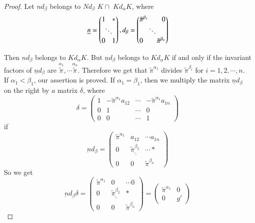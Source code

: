 \begin{proof}
  Let $n d _ \beta $ belongs to $N d_\beta$ $K \cap $ $Kd_\alpha  K$, where
  \begin {equation*}
    \underline{n}=
    \begin{pmatrix}
      1 \quad  *\\
      \ddots\\
      0 \quad  1
    \end{pmatrix}, 
    d_\beta=
    \begin{pmatrix}
       \tilde{\pi}^{\beta_1} \qquad 0\\
             \ddots\\
      0 \qquad  \tilde{\pi}^{\beta_n}
    \end{pmatrix}
  \end{equation*}
  
  Then $n d_\beta$  belongs to $K d_\alpha  K$. But   $\underline{n} d
  _\beta $ belongs to $ K d_\alpha  K $ if and only if the
  invariant factors of $\underline{n}  d_ \beta $ are $
  \overset{\alpha  _1} {\tilde {\pi}}, \cdots \overset{\alpha  _n}
          {\tilde {\pi}} $. Therefore we get that $\tilde{\pi}^{\alpha
            _1}$ divides $\tilde{\pi}^{\beta_i}$ for  $i = 1, 2,
          \cdots,  n$. If $\alpha_1 < 
          \beta_1$, our assertion is proved. If $ \alpha  _1 = \beta_1$,
          then we multiply the matrix $\underline n d_\beta$ on the
          right by $a$ matrix $\delta$, where 
   \begin{equation*}
     \delta =
     \begin{pmatrix}
       1& - \tilde{\pi}^ {\alpha _1} a _{12}& \cdots & -
       \tilde{\pi}^ {\alpha _1} a_{1n}\\ 
       0& 1 & \cdots& 0\\
       0& 0 & \cdots& 1
     \end{pmatrix}
   \end{equation*}
   if
   \begin{equation*}
     \underbar{n}d_\beta =
     \begin{pmatrix}
       \tilde{\pi}^{\alpha _1}& a_{12} & \cdots a_{1n}\\
       0 & \underset{\ddots}{\tilde{\pi}^{\beta _2}} & \cdots *\\
       0 & 0 & \tilde{\pi}^{\beta_n}
     \end{pmatrix}
   \end{equation*}\pageoriginale
   So we get
   \begin{equation*}
     \underbar{n}d_\beta \delta =
     \begin{pmatrix}
       \tilde{\pi}^{\alpha _1}& 0& \cdots 0\\
       0 & \underset{\ddots}{\tilde{\pi}^{\beta _2}} &  *\\
       0 & 0 & \tilde{\pi}^{\beta_n}
     \end{pmatrix}
     = 
     \begin{pmatrix}
       {\tilde{\pi}^{\alpha _1}}& 0\\
       0 & g'
     \end{pmatrix}
   \end{equation*}
   

\end{proof}
